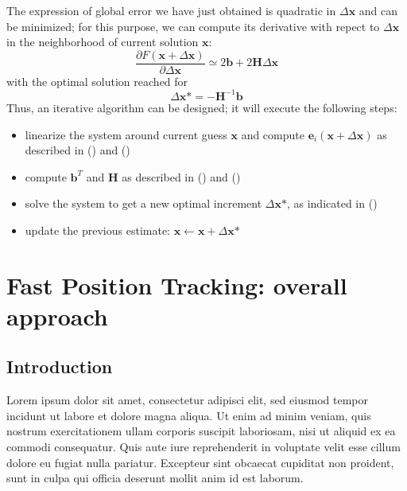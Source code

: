 \documentclass[a4paper, onecolumn]{report}
\begin{document}
The expression of global error we have just obtained is quadratic in $\Delta\textbf{x}$ and can be minimized; for this purpose, we can compute its derivative with repect to $\Delta\textbf{x}$ in the neighborhood of current solution $\textbf{x}$:
\begin{equation}
\frac{\partial F(\textbf{x}+\Delta\textbf{x})}{\partial\Delta\textbf{x}} \simeq 2\textbf{b} + 2\textbf{H}\Delta\textbf{x}
\end{equation}
with the optimal solution reached for 
\begin{equation}
\Delta\textbf{x*} = -\textbf{H}^{-1}\textbf{b}
\end{equation}
Thus, an iterative algorithm can be designed; it will execute the following steps:
\begin{itemize}
	\item{linearize the system around current guess $\textbf{x}$ and compute $\textbf{e}_i(\textbf{x} + \Delta\textbf{x})$ as described in () and ()}
	\item{compute $\textbf{b}^T$ and $\textbf{H}$ as described in () and ()}
	\item{solve the system to get a new optimal increment $\Delta\textbf{x*}$, as indicated in ()}
	\item{update the previous estimate: $\textbf{x} \leftarrow \textbf{x} + \Delta\textbf{x*}$}
\end{itemize}


\chapter{ Fast Position Tracking: overall approach}

\section{Introduction}
Lorem ipsum dolor sit amet, consectetur adipisci elit, sed eiusmod tempor incidunt ut labore et dolore magna aliqua. Ut enim ad minim veniam, quis nostrum exercitationem ullam corporis suscipit laboriosam, nisi ut aliquid ex ea commodi consequatur. Quis aute iure reprehenderit in voluptate velit esse cillum dolore eu fugiat nulla pariatur. Excepteur sint obcaecat cupiditat non proident, sunt in culpa qui officia deserunt mollit anim id est laborum.
\end{document}
